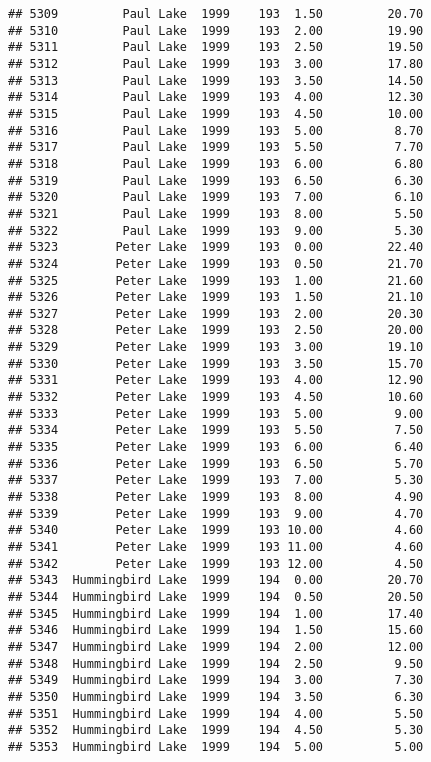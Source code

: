 \documentclass[
]{article}
\begin{document}
\begin{verbatim}
## 5309         Paul Lake  1999    193  1.50         20.70
## 5310         Paul Lake  1999    193  2.00         19.90
## 5311         Paul Lake  1999    193  2.50         19.50
## 5312         Paul Lake  1999    193  3.00         17.80
## 5313         Paul Lake  1999    193  3.50         14.50
## 5314         Paul Lake  1999    193  4.00         12.30
## 5315         Paul Lake  1999    193  4.50         10.00
## 5316         Paul Lake  1999    193  5.00          8.70
## 5317         Paul Lake  1999    193  5.50          7.70
## 5318         Paul Lake  1999    193  6.00          6.80
## 5319         Paul Lake  1999    193  6.50          6.30
## 5320         Paul Lake  1999    193  7.00          6.10
## 5321         Paul Lake  1999    193  8.00          5.50
## 5322         Paul Lake  1999    193  9.00          5.30
## 5323        Peter Lake  1999    193  0.00         22.40
## 5324        Peter Lake  1999    193  0.50         21.70
## 5325        Peter Lake  1999    193  1.00         21.60
## 5326        Peter Lake  1999    193  1.50         21.10
## 5327        Peter Lake  1999    193  2.00         20.30
## 5328        Peter Lake  1999    193  2.50         20.00
## 5329        Peter Lake  1999    193  3.00         19.10
## 5330        Peter Lake  1999    193  3.50         15.70
## 5331        Peter Lake  1999    193  4.00         12.90
## 5332        Peter Lake  1999    193  4.50         10.60
## 5333        Peter Lake  1999    193  5.00          9.00
## 5334        Peter Lake  1999    193  5.50          7.50
## 5335        Peter Lake  1999    193  6.00          6.40
## 5336        Peter Lake  1999    193  6.50          5.70
## 5337        Peter Lake  1999    193  7.00          5.30
## 5338        Peter Lake  1999    193  8.00          4.90
## 5339        Peter Lake  1999    193  9.00          4.70
## 5340        Peter Lake  1999    193 10.00          4.60
## 5341        Peter Lake  1999    193 11.00          4.60
## 5342        Peter Lake  1999    193 12.00          4.50
## 5343  Hummingbird Lake  1999    194  0.00         20.70
## 5344  Hummingbird Lake  1999    194  0.50         20.50
## 5345  Hummingbird Lake  1999    194  1.00         17.40
## 5346  Hummingbird Lake  1999    194  1.50         15.60
## 5347  Hummingbird Lake  1999    194  2.00         12.00
## 5348  Hummingbird Lake  1999    194  2.50          9.50
## 5349  Hummingbird Lake  1999    194  3.00          7.30
## 5350  Hummingbird Lake  1999    194  3.50          6.30
## 5351  Hummingbird Lake  1999    194  4.00          5.50
## 5352  Hummingbird Lake  1999    194  4.50          5.30
## 5353  Hummingbird Lake  1999    194  5.00          5.00

\end{verbatim}
\end{document}
